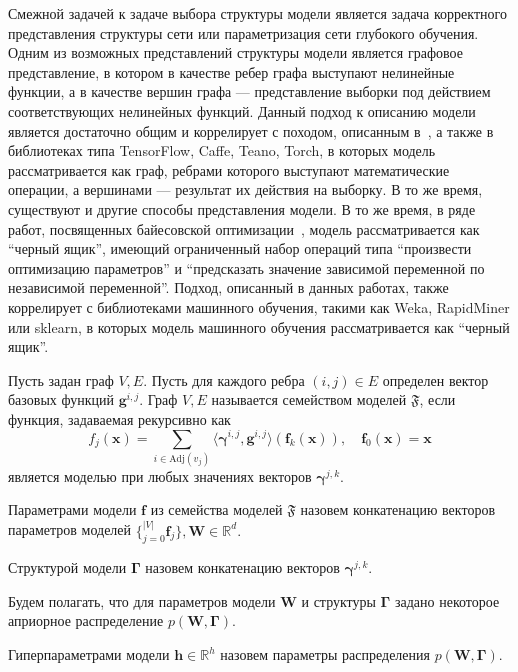 Смежной задачей к задаче выбора структуры модели является задача корректного представления структуры сети или параметризация сети глубокого обучения. Одним из возможных представлений структуры модели является графовое представление, в котором в качестве ребер графа выступают нелинейные функции, а в качестве вершин графа --- представление выборки под действием соответствующих нелинейных функций. 
Данный подход к описанию модели является достаточно общим и коррелирует с походом, описанным в~\cite{vokov}, а также в библиотеках типа TensorFlow, Caffe, Teano, Torch, в которых модель рассматривается как граф, ребрами которого выступают математические операции, а вершинами --- результат их действия на выборку. 
 В то же время, существуют и другие способы представления модели. В то же время, в ряде работ, посвященных байесовской оптимизации~\cite{snoek_deep,rbf_surrogate,bo_gp}, модель рассматривается как ``черный ящик'', имеющий ограниченный набор операций типа ``произвести оптимизацию параметров'' и ``предсказать значение зависимой переменной по независимой переменной''.
Подход, описанный в данных работах, также коррелирует с  библиотеками машинного обучения, такими как Weka, RapidMiner или sklearn, в которых модель машинного обучения рассматривается как ``черный ящик''.

\begin{defin}
Пусть задан граф $V,E$. Пусть для каждого ребра $(i,j) \in E$ определен вектор базовых функций $\mathbf{g}^{i,j}.$ Граф $V, E$ называется семейством моделей $\mathfrak{F}$, если функция, задаваемая рекурсивно как 
\[
    f_j(\mathbf{x}) = \sum_{i \in \text{Adj}(v_j)} \langle \boldsymbol{\gamma}^{i,j}, \mathbf{g}^{i,j} \rangle \left(\mathbf{f}_k(\mathbf{x})\right), \quad \mathbf{f}_0(\mathbf{x}) = \mathbf{x}
\]
является моделью при любых значениях векторов $\boldsymbol{\gamma}^{j,k}$.
\end{defin}

\begin{defin}
Параметрами модели $\mathbf{f}$ из семейства моделей $\mathfrak{F}$  назовем конкатенацию векторов параметров моделей $\{_{j=0}^|V| \mathbf{f}_j\}, \mathbf{W} \in \mathbb{R}^d.$
\end{defin}

\begin{defin}
Структурой модели $\boldsymbol{\Gamma}$ назовем конкатенацию векторов $\boldsymbol{\gamma}^{j,k}$.
\end{defin}

Будем полагать, что для параметров модели $\mathbf{W}$ и структуры  $\boldsymbol{\Gamma}$ задано некоторое априорное распределение $p(\mathbf{W}, \boldsymbol{\Gamma})$.
\begin{defin}
Гиперпараметрами модели $\mathbf{h}\in \mathbb{R}^h$ назовем параметры распределения $p(\mathbf{W}, \boldsymbol{\Gamma})$.
\end{defin}

